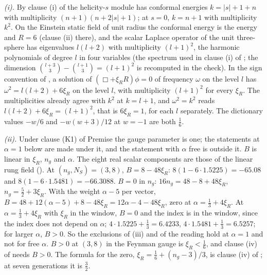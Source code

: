 \emph{(i).} By clause (i) of  the helicity-$s$ module has conformal energies $k = |s| + 1 + n$ with multiplicity $(n + 1)(n + 2|s| + 1)$; at $s = 0$, $k = n + 1$ with multiplicity $k^{2}$. On the Einstein static field of unit radius the conformal energy is the energy and $R = 6$ (clause (ii) there), and the scalar Laplace operator of the unit three-sphere has eigenvalues $l(l + 2)$ with multiplicity $(l + 1)^{2}$, the harmonic polynomials of degree $l$ in four variables (the spectrum used in clause (i) of ; the dimension $\binom{l+3}{3} - \binom{l+1}{3} = (l+1)^{2}$ is recomputed in the check). In the sign convention of , a solution of $(\Box + \xi_{R}R)\phi = 0$ of frequency $\omega$ on the level $l$ has $\omega^{2} = l(l + 2) + 6\xi_{R}$ on the level $l$, with multiplicity $(l + 1)^{2}$ for every $\xi_{R}$. The multiplicities already agree with $k^{2}$ at $k = l + 1$, and $\omega^{2} = k^{2}$ reads $l(l + 2) + 6\xi_{R} = (l + 1)^{2}$, that is $6\xi_{R} = 1$, for each $l$ separately. The dictionary values $-w/6$ and $-w(w + 3)/12$ at $w = -1$ are both $\tfrac16$.

\emph{(ii).} Under clause (K1) of Premise  the gauge parameter is one; the statements at $\alpha = 1$ below are made under it, and the statement with $\alpha$ free is outside it. $B$ is linear in $\xi_{R}$, $n_{g}$ and $\alpha$. The eight real scalar components are those of the linear rung field (). At $(n_{g}, N_{S}) = (3, 8)$, $B = 8 - 48\xi_{R}$: $8(1 - 6\cdot1.5225) = -65.08$ and $8(1 - 6\cdot1.5481) = -66.3088$. $B = 0$ in $n_{g}$: $16n_{g} = 48 - 8 + 48\xi_{R}$, $n_{g} = \tfrac52 + 3\xi_{R}$. With the weight $\alpha - 5$ per vector, $B = 48 + 12(\alpha - 5) + 8 - 48\xi_{R} = 12\alpha - 4 - 48\xi_{R}$, zero at $\alpha = \tfrac13 + 4\xi_{R}$. At $\alpha = \tfrac13 + 4\xi_{R}$ with $\xi_{R}$ in the window, $B = 0$ and the index is in the window, since the index does not depend on $\alpha$; $4\cdot1.5225 + \tfrac13 = 6.4233$, $4\cdot1.5481 + \tfrac13 = 6.5257$; for larger $\alpha$, $B > 0$. So the exclusions of (iii) and of the reading hold at $\alpha = 1$ and not for free $\alpha$. $B > 0$ at $(3, 8)$ in the Feynman gauge is $\xi_{R} < \tfrac16$, and clause (iv) of  needs $B > 0$. The formula for the zero, $\xi_{R} = \tfrac16 + (n_{g} - 3)/3$, is clause (iv) of ; at seven generations it is $\tfrac32$.

